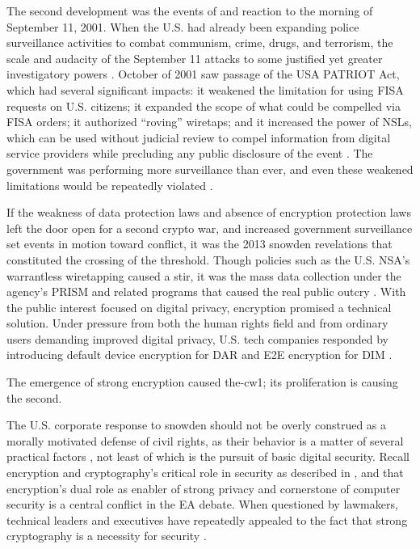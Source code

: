 The second development was the events of and reaction to the morning of September 11, 2001. When the U.S. had already
been expanding police surveillance activities to combat communism, crime, drugs, and terrorism, the scale and audacity
of the September 11 attacks to some justified yet greater investigatory powers \cite{bloss_escalating_2007}. October of
2001 saw passage of the USA PATRIOT Act, which had several significant impacts: it weakened the limitation for using
\ac{FISA} requests on U.S. citizens; it expanded the scope of what could be compelled via \ac{FISA} orders; it
authorized ``roving'' wiretaps; and it increased the power of \acp{NSL}, which can be used without judicial review to
compel information from digital service providers while precluding any public disclosure of the event
\cite{sensenbrenner_2001} \cite{shamsi_2011}. The government was performing more surveillance than ever, and even these
weakened limitations would be repeatedly violated \cite{shamsi_2011} \cite{tucker_2020}.

If the weakness of data protection laws and absence of encryption protection laws left the door open for a second crypto
war, and increased government surveillance set events in motion toward conflict, it was the 2013 \ac{snowden}
revelations that constituted the crossing of the threshold. Though policies such as the U.S. \ac{NSA}'s warrantless
wiretapping caused a stir, it was the mass data collection under the agency's \ac{PRISM} and related programs that
caused the real public outcry \cite{landau_making_2013}. With the public interest focused on digital privacy, encryption
promised a technical solution. Under pressure from both the human rights field and from ordinary users demanding
improved digital privacy, U.S. tech companies responded by introducing default device encryption for \acl{DAR} and
\acl{E2E} encryption for \acl{DIM} \cite{treguer_us_2018}.

The emergence of strong encryption caused \ac{the-cw1}; its proliferation is causing the second.

The U.S. corporate response to \ac{snowden} should not be overly construed as a morally motivated defense of civil
rights, as their behavior is a matter of several practical factors \cite{treguer_us_2018}, not least of which is the
pursuit of basic digital security. Recall encryption and cryptography's critical role in security as described in
, and that encryption's dual role as enabler of strong privacy and cornerstone of computer
security is a central conflict in the \ac{EA} debate. When questioned by lawmakers, technical leaders and executives
have repeatedly appealed to the fact that strong cryptography is a necessity for security \cite{schulze_clipper_2017}.

